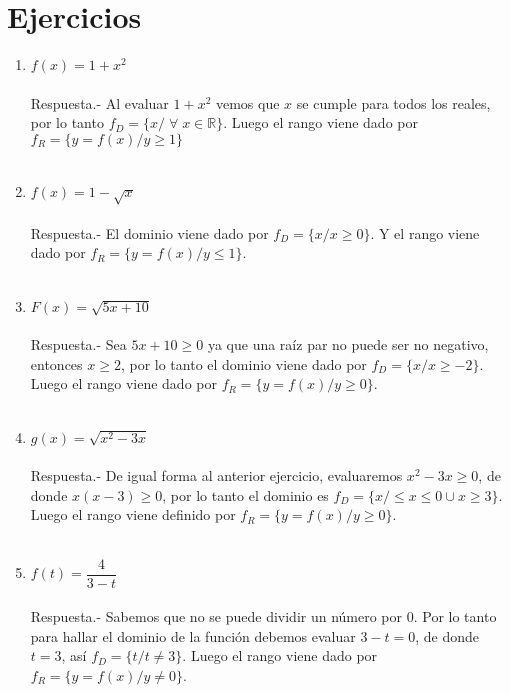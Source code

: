 \setcounter{section}{0}
\section{Ejercicios}

\begin{enumerate}

    \item $f(x)=1+x^2$ \\\\
	Respuesta.-\; Al evaluar $1+x^2$ vemos que $x$ se cumple para todos los reales, por lo tanto $f_D=\lbrace x / \; \forall \; x \in \mathbb{R} \rbrace$. Luego el rango viene dado por $f_R=\lbrace y=f(x) / y \geq 1 \rbrace$\\\\

    \item $f(x)=1-\sqrt{x}$\\\\
       Respuesta.-\; El dominio viene dado por $f_D=\lbrace x / x \geq 0 \rbrace$. Y el rango viene dado por $f_R = \lbrace y = f(x) / y \leq 1 \rbrace$.\\\\

    \item $F(x)=\sqrt{5x + 10}$\\\\
	Respuesta.-\; Sea $5x + 10 \geq 0$ ya que una raíz par no puede ser no negativo, entonces $x \geq 2$, por lo tanto el dominio viene dado por $f_D=\lbrace x / x \geq -2 \rbrace$. Luego el rango viene dado por $f_R = \lbrace y=f(x) / y \geq 0 \rbrace$.\\\\

    \item $g(x)=\sqrt{x^2 - 3x}$\\\\
	Respuesta.-\; De igual forma al anterior ejercicio, evaluaremos $x^2 - 3x \geq 0$, de donde $x(x-3)\geq 0$, por lo tanto el dominio es $f_D=\lbrace x/\leq x \leq 0 \cup x \geq 3 \rbrace$. Luego el rango viene definido por $f_R=\lbrace y=f(x) / y \geq 0 \rbrace$.\\\\

    \item $f(t)=\dfrac{4}{3-t}$ \\\\
	Respuesta.-\; Sabemos que no se puede dividir un número por $0$. Por lo tanto para hallar el dominio de la función debemos evaluar $3-t=0$, de donde $t=3$, así $f_D=\lbrace t / t\neq 3\rbrace$. Luego el rango viene dado por $f_R=\lbrace y=f(x) / y\neq 0\rbrace$.\\\\


\end{enumerate}
